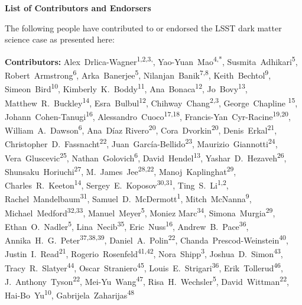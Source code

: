 
\begin{center}
  {\Large \bf List of Contributors and Endorsers}
\end{center}
\bigskip

The following people have contributed to or endorsed the LSST dark matter science case as presented here:

\def\altaffilmark#1{\textsuperscript{#1}}
\def\affil#1{\noindent #1 \\}

\normalsize
\begin{raggedright}
\textbf{Contributors:}
Alex~Drlica-Wagner\altaffilmark{1,2,3,\textdagger},
Yao-Yuan~Mao\altaffilmark{4,*},
Susmita~Adhikari\altaffilmark{5},
Robert~Armstrong\altaffilmark{6},
Arka~Banerjee\altaffilmark{5},
Nilanjan~Banik\altaffilmark{7,8},
Keith~Bechtol\altaffilmark{9},
Simeon~Bird\altaffilmark{10},
Kimberly~K.~Boddy\altaffilmark{11},
Ana~Bonaca\altaffilmark{12},
Jo~Bovy\altaffilmark{13},
Matthew~R.~Buckley\altaffilmark{14},
Esra~Bulbul\altaffilmark{12},
Chihway~Chang\altaffilmark{2,3},
George~Chapline \altaffilmark{15},
Johann~Cohen-Tanugi\altaffilmark{16},
Alessandro~Cuoco\altaffilmark{17,18},
Francis-Yan~Cyr-Racine\altaffilmark{19,20},
William~A.~Dawson\altaffilmark{6},
Ana~D\'{i}az Rivero\altaffilmark{20},
Cora~Dvorkin\altaffilmark{20},
Denis~Erkal\altaffilmark{21},
Christopher~D.~Fassnacht\altaffilmark{22},
Juan~Garc\'ia-Bellido\altaffilmark{23},
Maurizio~Giannotti\altaffilmark{24},
Vera~Gluscevic\altaffilmark{25},
Nathan~Golovich\altaffilmark{6},
David~Hendel\altaffilmark{13},
Yashar~D.~Hezaveh\altaffilmark{26},
Shunsaku~Horiuchi\altaffilmark{27},
M.~James~Jee\altaffilmark{28,22},
Manoj~Kaplinghat\altaffilmark{29},
Charles~R.~Keeton\altaffilmark{14},
Sergey~E.~Koposov\altaffilmark{30,31},
Ting~S.~Li\altaffilmark{1,2},
Rachel~Mandelbaum\altaffilmark{31},
Samuel~D.~McDermott\altaffilmark{1},
Mitch~McNanna\altaffilmark{9},
Michael~Medford\altaffilmark{32,33},
Manuel~Meyer\altaffilmark{5},
Moniez Marc\altaffilmark{34},
Simona~Murgia\altaffilmark{29},
Ethan~O.~Nadler\altaffilmark{5},
Lina~Necib\altaffilmark{35},
Eric~Nuss\altaffilmark{16},
Andrew~B.~Pace\altaffilmark{36},
Annika~H.~G.~Peter\altaffilmark{37,38,39},
Daniel~A.~Polin\altaffilmark{22},
Chanda~Prescod-Weinstein\altaffilmark{40},
Justin~I.~Read\altaffilmark{21},
Rogerio~Rosenfeld\altaffilmark{41,42},
Nora~Shipp\altaffilmark{3},
Joshua~D.~Simon\altaffilmark{43},
Tracy~R.~Slatyer\altaffilmark{44},
Oscar~Straniero\altaffilmark{45},
Louis~E.~Strigari\altaffilmark{36},
Erik~Tollerud\altaffilmark{46},
J.~Anthony~Tyson\altaffilmark{22},
Mei-Yu~Wang\altaffilmark{47},
Risa~H.~Wechsler\altaffilmark{5},
David~Wittman\altaffilmark{22},
Hai-Bo~Yu\altaffilmark{10},
Gabrijela~Zaharijas\altaffilmark{48}


\end{raggedright}
